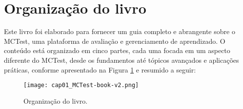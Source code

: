 \section{Organização do livro}

Este livro foi elaborado para fornecer um guia completo e abrangente sobre o MCTest, uma plataforma de avaliação e gerenciamento de aprendizado. O conteúdo está organizado em cinco partes, cada uma focada em um aspecto diferente do MCTest, desde os fundamentos até tópicos avançados e aplicações práticas, conforme apresentado na Figura \ref{fig:cap01_MCTest-book-v2} e resumido a seguir:

\begin{figure}[!ht]
  \centering
  \texttt{[image: cap01\_MCTest-book-v2.png]}
  \caption{Organização do livro.}
  \label{fig:cap01_MCTest-book-v2}
\end{figure}

